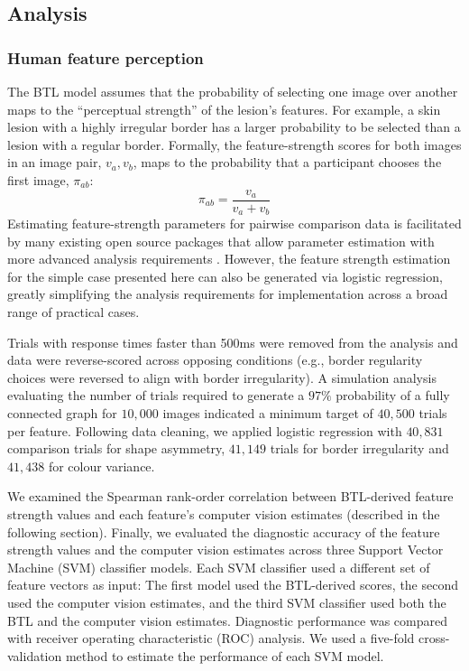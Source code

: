 \documentclass[
    man, 12pt, a4paper,
    donotrepeattitle, floatsintext, draftfirst
]{apa7}
\begin{document}
\subsection{Analysis}
\subsubsection{Human feature perception}
The BTL model assumes that the probability of selecting one image over another maps to the ``perceptual strength'' of the lesion's features.
For example, a skin lesion with a highly irregular border has a larger probability to be selected than a lesion with a regular border. Formally, the feature-strength scores for both images in an image pair, $v_a, v_b$, maps to the probability that a participant chooses the first image, $\pi_{ab}$:
\[\pi_{ab} = \frac{v_a}{v_a + v_b}\]
{\color{red}
    Estimating feature-strength parameters for pairwise comparison data is facilitated by many existing open source packages that allow parameter estimation with more advanced analysis requirements \parencite[e.g.,][]{turner2012btl}.
    However, the feature strength estimation for the simple case presented here can also be generated via logistic regression, greatly simplifying the analysis requirements for implementation across a broad range of practical cases.
}

Trials with response times faster than 500ms were removed from the analysis and data were reverse-scored across opposing conditions (e.g., border regularity choices were reversed to align with border irregularity). A simulation analysis evaluating the number of trials required to generate a $97\%$ probability of a fully connected graph for $10,000$ images indicated a minimum target of $40,500$ trials per feature. Following data cleaning, we applied logistic regression with $40,831$ comparison trials for shape asymmetry, $41,149$ trials for border irregularity and $41,438$ for colour variance.

We examined the Spearman rank-order correlation between BTL-derived feature strength values and each feature's computer vision estimates (described in the following section).
Finally, we evaluated the diagnostic accuracy of the feature strength values and the computer vision estimates across three Support Vector Machine (SVM) classifier models.
Each SVM classifier used a different set of feature vectors as input: The first model used the BTL-derived scores, the second used the computer vision estimates, and the third SVM classifier used both the BTL and the computer vision estimates.
Diagnostic performance was compared with receiver operating characteristic (ROC) analysis.
We used a five-fold cross-validation method to estimate the performance of each SVM model.
\end{document}
